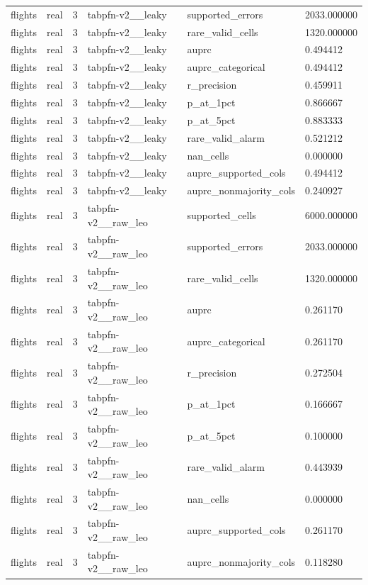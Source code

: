 \begin{tabular}{llllll}
flights & real & 3 & tabpfn-v2\_\_leaky & supported\_errors & 2033.000000 \\
flights & real & 3 & tabpfn-v2\_\_leaky & rare\_valid\_cells & 1320.000000 \\
flights & real & 3 & tabpfn-v2\_\_leaky & auprc & 0.494412 \\
flights & real & 3 & tabpfn-v2\_\_leaky & auprc\_categorical & 0.494412 \\
flights & real & 3 & tabpfn-v2\_\_leaky & r\_precision & 0.459911 \\
flights & real & 3 & tabpfn-v2\_\_leaky & p\_at\_1pct & 0.866667 \\
flights & real & 3 & tabpfn-v2\_\_leaky & p\_at\_5pct & 0.883333 \\
flights & real & 3 & tabpfn-v2\_\_leaky & rare\_valid\_alarm & 0.521212 \\
flights & real & 3 & tabpfn-v2\_\_leaky & nan\_cells & 0.000000 \\
flights & real & 3 & tabpfn-v2\_\_leaky & auprc\_supported\_cols & 0.494412 \\
flights & real & 3 & tabpfn-v2\_\_leaky & auprc\_nonmajority\_cols & 0.240927 \\
flights & real & 3 & tabpfn-v2\_\_raw\_leo & supported\_cells & 6000.000000 \\
flights & real & 3 & tabpfn-v2\_\_raw\_leo & supported\_errors & 2033.000000 \\
flights & real & 3 & tabpfn-v2\_\_raw\_leo & rare\_valid\_cells & 1320.000000 \\
flights & real & 3 & tabpfn-v2\_\_raw\_leo & auprc & 0.261170 \\
flights & real & 3 & tabpfn-v2\_\_raw\_leo & auprc\_categorical & 0.261170 \\
flights & real & 3 & tabpfn-v2\_\_raw\_leo & r\_precision & 0.272504 \\
flights & real & 3 & tabpfn-v2\_\_raw\_leo & p\_at\_1pct & 0.166667 \\
flights & real & 3 & tabpfn-v2\_\_raw\_leo & p\_at\_5pct & 0.100000 \\
flights & real & 3 & tabpfn-v2\_\_raw\_leo & rare\_valid\_alarm & 0.443939 \\
flights & real & 3 & tabpfn-v2\_\_raw\_leo & nan\_cells & 0.000000 \\
flights & real & 3 & tabpfn-v2\_\_raw\_leo & auprc\_supported\_cols & 0.261170 \\
flights & real & 3 & tabpfn-v2\_\_raw\_leo & auprc\_nonmajority\_cols & 0.118280 \\

\end{tabular}

